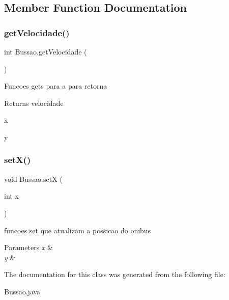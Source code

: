 \subsection{Member Function Documentation}
\mbox{\label{class_bussao_abb46f53b1efc7cb098a01244d01dbd49}} 
\subsubsection{get\+Velocidade()}
{\footnotesize\ttfamily int Bussao.\+get\+Velocidade (\begin{DoxyParamCaption}{ }\end{DoxyParamCaption})}

Funcoes gets para a para retorna \begin{DoxyReturn}{Returns}
velocidade 

x 

y 
\end{DoxyReturn}
\mbox{\label{class_bussao_a6f985faf24ac6d48af78718a2da91778}} 
\subsubsection{set\+X()}
{\footnotesize\ttfamily void Bussao.\+setX (\begin{DoxyParamCaption}\item[{int}]{x }\end{DoxyParamCaption})}

funcoes set que atualizam a possicao do onibus


\begin{DoxyParams}{Parameters}
{\em x} & \\
\hline
{\em y} & \\
\hline
\end{DoxyParams}


The documentation for this class was generated from the following file\+:\begin{DoxyCompactItemize}
\item 
Bussao.\+java\end{DoxyCompactItemize}
